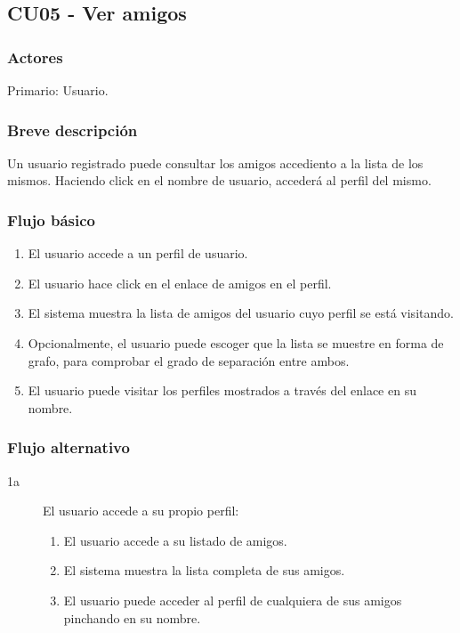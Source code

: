 \documentclass[12pt, a4paper, titlepage]{article}
\begin{document}
\subsection{CU05 - Ver amigos}
\subsubsection{Actores}
Primario: Usuario.
\subsubsection{Breve descripción}
Un usuario registrado puede consultar los amigos accediento a la lista de los mismos. Haciendo click en el nombre de usuario, accederá al perfil del mismo.
\subsubsection{Flujo básico}
\begin{enumerate}
	\item El usuario accede a un perfil de usuario.
	\item El usuario hace click en el enlace de amigos en el perfil.
	\item El sistema muestra la lista de amigos del usuario cuyo perfil se está visitando.
	\item Opcionalmente, el usuario puede escoger que la lista se muestre en forma de grafo, para comprobar el grado de separación entre ambos.
	\item El usuario puede visitar los perfiles mostrados a través del enlace en su nombre.
\end{enumerate}

\subsubsection{Flujo alternativo}

\begin{description}
	\item [1a] El usuario accede a su propio perfil:
	\begin{enumerate}
		\item El usuario accede a su listado de amigos.
		\item El sistema muestra la lista completa de sus amigos.
		\item El usuario puede acceder al perfil de cualquiera de sus amigos pinchando en su nombre.
	\end{enumerate}
\end{description}
\end{document}
